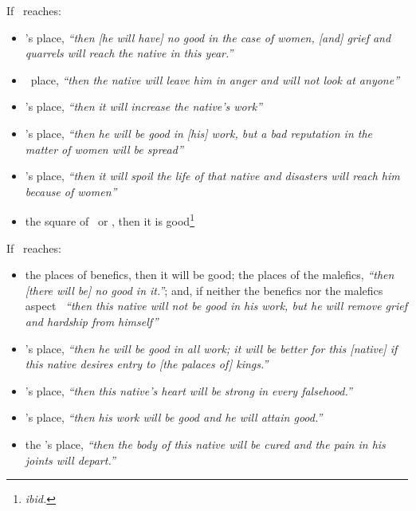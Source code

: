 If  \Venus\, reaches:
\begin{itemize}[topsep=0em,itemsep=0em]
\item  \Jupiter's place, \textsl{``then [he will have] no good in the case of women, [and] grief and quarrels will reach the native in this year.''}

\item \Mars\, place, \textsl{``then the native will leave him in anger and will not look at anyone''}

\item \Mercury's place, \textsl{``then it will increase the native's work''}

\item \Moon's place, \textsl{``then he will be good in [his] work, but a bad reputation in the matter of women will be spread''}

\item \Sun's place, \textsl{``then it will spoil the life of that native and disasters will reach him because of women''}

\item the square of \Mars\, or \Saturn, then it is good\footnote{\textsl{ibid.}}
\end{itemize}

If  \Mercury\, reaches:
\begin{itemize}[topsep=0em,itemsep=0em]
\item the places of benefics, then it will be good; the places of the malefics, \textsl{``then [there will be] no good in it.''}; and, if neither the benefics nor the malefics aspect \Mercury\, \textsl{``then this native will not be good in his work, but he will remove grief and hardship from himself''}

\item \Jupiter's place, \textsl{``then he will be good in all work; it will be better for this [native] if this native desires entry to [the palaces of] kings.''}

\item \Mars's place, \textsl{``then this native's heart will be strong in every falsehood.''}

\item \Venus's place, \textsl{``then his work will be good and he will attain good.''}

\item the \Moon's place, \textsl{``then the body of this native will be cured and the pain in his joints will depart.''}
\end{itemize}



